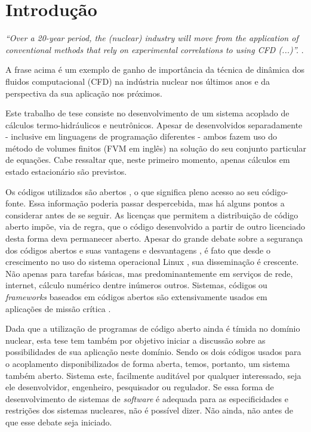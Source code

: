 \chapter*[Introdução]{Introdução}
\label{chap:introducao}

\emph{``Over a 20-year period, the (nuclear) industry will move from 
the application of conventional methods that rely on 
experimental correlations to using CFD (...)''.} \cite[p.~655]{Baglietto2011}.

A frase acima é um exemplo de ganho de importância da técnica de dinâmica dos fluidos 
computacional (CFD) na indústria nuclear nos últimos anos e da perspectiva da sua aplicação 
nos próximos.  

Este trabalho de tese consiste no desenvolvimento de um sistema acoplado de cálculos
termo-hidráulicos e neutrônicos. Apesar de desenvolvidos separadamente - inclusive
em linguagens de programação diferentes - ambos fazem uso do método de volumes
finitos \cite{Eymard2003} (FVM em inglês) na solução do seu conjunto particular de equações.
Cabe ressaltar que, neste primeiro momento, apenas cálculos em estado estacionário
são previstos.

Os códigos utilizados são abertos \cite[Capítulo~3]{Stallman2002}, o que significa pleno acesso ao seu código-fonte.
Essa informação poderia passar despercebida, mas há alguns pontos a considerar antes de se
seguir. As licenças que permitem a distribuição de código aberto impõe, via de regra, que
o código desenvolvido a partir de outro licenciado desta forma deva permanecer aberto.
Apesar do grande debate sobre a segurança dos códigos abertos e suas vantagens e desvantagens \cite[Seção~2.6]{Androutsellis2010},
é fato que desde o crescimento no uso do sistema operacional Linux \cite{LinuxBritannica}, sua disseminação é crescente.
Não apenas para tarefas básicas, mas predominantemente em serviços de rede, internet, cálculo numérico dentre
inúmeros outros. Sistemas, códigos ou \textit{frameworks} baseados em códigos abertos são
extensivamente usados em aplicações de missão crítica \cite{Norris2004}.

Dada que a utilização de programas de código aberto ainda é tímida no domínio nuclear,
esta tese tem também por objetivo iniciar a discussão sobre as possibilidades de sua
aplicação neste domínio. Sendo os dois códigos usados para o acoplamento disponibilizados
de forma aberta, temos, portanto, um sistema também aberto. Sistema este, facilmente auditável
por qualquer interessado, seja ele desenvolvidor, engenheiro, pesquisador ou regulador.
Se essa forma de desenvolvimento de sistemas de \textit{software} é adequada para as especificidades
e restrições dos sistemas nucleares, não é possível dizer. Não ainda, não antes de que esse debate
seja iniciado.

